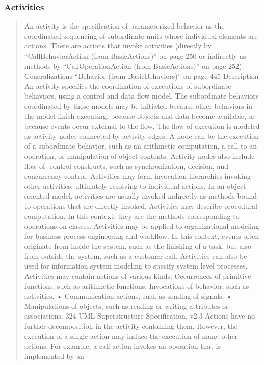 \subsubsection{Activities}
\begin{quotation}
An activity is the specification of parameterized behavior as the coordinated sequencing of subordinate units whose
individual elements are actions. There are actions that invoke activities (directly by “CallBehaviorAction (from
BasicActions)” on page 250 or indirectly as methods by “CallOperationAction (from BasicActions)” on page 252).
Generalizations
 “Behavior (from BasicBehaviors)” on page 445
Description
An activity specifies the coordination of executions of subordinate behaviors, using a control and data flow model. The
subordinate behaviors coordinated by these models may be initiated because other behaviors in the model finish
executing, because objects and data become available, or because events occur external to the flow. The flow of execution
is modeled as activity nodes connected by activity edges. A node can be the execution of a subordinate behavior, such as
an arithmetic computation, a call to an operation, or manipulation of object contents. Activity nodes also include flow-of-
control constructs, such as synchronization, decision, and concurrency control. Activities may form invocation hierarchies
invoking other activities, ultimately resolving to individual actions. In an object-oriented model, activities are usually
invoked indirectly as methods bound to operations that are directly invoked.
Activities may describe procedural computation. In this context, they are the methods corresponding to operations on
classes. Activities may be applied to organizational modeling for business process engineering and workflow. In this
context, events often originate from inside the system, such as the finishing of a task, but also from outside the system,
such as a customer call. Activities can also be used for information system modeling to specify system level processes.
Activities may contain actions of various kinds:
 Occurrences of primitive functions, such as arithmetic functions.
 Invocations of behavior, such as activities.
• Communication actions, such as sending of signals.
• Manipulations of objects, such as reading or writing attributes or associations.
324
UML Superstructure Specification, v2.3
Actions have no further decomposition in the activity containing them. However, the execution of a single action may
induce the execution of many other actions. For example, a call action invokes an operation that is implemented by an

\end{quotation}
